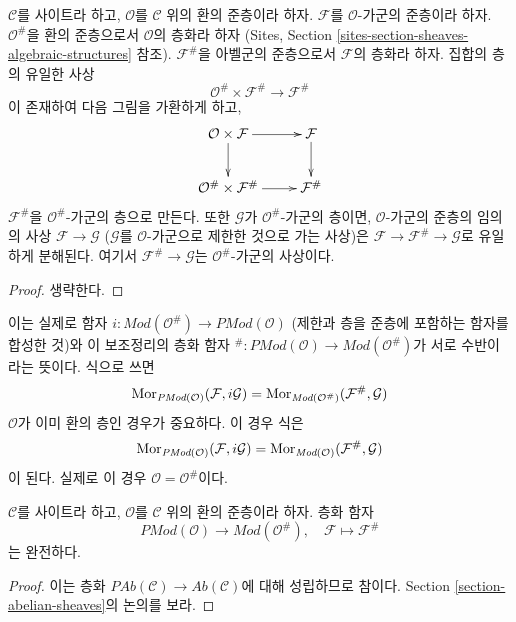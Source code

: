 \begin{lemma}
\label{lemma-sheafification-presheaf-modules}
$\mathcal{C}$를 사이트라 하고, $\mathcal{O}$를 $\mathcal{C}$ 위의 환의
준층이라 하자. $\mathcal{F}$를 $\mathcal{O}$-가군의 준층이라 하자.
$\mathcal{O}^\#$을 환의 준층으로서 $\mathcal{O}$의 층화라 하자
(Sites, Section \ref{sites-section-sheaves-algebraic-structures} 참조).
$\mathcal{F}^\#$을 아벨군의 준층으로서 $\mathcal{F}$의 층화라 하자.
집합의 층의 유일한 사상
$$
\mathcal{O}^\# \times \mathcal{F}^\#
\longrightarrow
\mathcal{F}^\#
$$
이 존재하여 다음 그림을 가환하게 하고,
$$
\xymatrix{
\mathcal{O} \times \mathcal{F} \ar[r] \ar[d] &
\mathcal{F} \ar[d] \\
\mathcal{O}^\# \times \mathcal{F}^\# \ar[r] &
\mathcal{F}^\#
}
$$
$\mathcal{F}^\#$을 $\mathcal{O}^\#$-가군의 층으로 만든다. 또한
$\mathcal{G}$가 $\mathcal{O}^\#$-가군의 층이면, $\mathcal{O}$-가군의
준층의 임의의 사상 $\mathcal{F} \to \mathcal{G}$
($\mathcal{G}$를 $\mathcal{O}$-가군으로 제한한 것으로 가는 사상)은
$\mathcal{F} \to \mathcal{F}^\# \to \mathcal{G}$로 유일하게 분해된다.
여기서 $\mathcal{F}^\# \to \mathcal{G}$는 $\mathcal{O}^\#$-가군의 사상이다.
\end{lemma}

\begin{proof}
생략한다.
\end{proof}

\noindent
이는 실제로 함자
$i : \textit{Mod}(\mathcal{O}^\#) \to \textit{PMod}(\mathcal{O})$
(제한과 층을 준층에 포함하는 함자를 합성한 것)와 이 보조정리의 층화 함자
${}^\# : \textit{PMod}(\mathcal{O}) \to \textit{Mod}(\mathcal{O}^\#)$가
서로 수반이라는 뜻이다. 식으로 쓰면
$$
\mathop{\mathrm{Mor}}\nolimits_{\textit{PMod}(\mathcal{O})}(\mathcal{F}, i\mathcal{G})
=
\mathop{\mathrm{Mor}}\nolimits_{\textit{Mod}(\mathcal{O}^\#)}(\mathcal{F}^\#, \mathcal{G})
$$
$\mathcal{O}$가 이미 환의 층인 경우가 중요하다. 이 경우 식은
$$
\mathop{\mathrm{Mor}}\nolimits_{\textit{PMod}(\mathcal{O})}(\mathcal{F}, i\mathcal{G})
=
\mathop{\mathrm{Mor}}\nolimits_{\textit{Mod}(\mathcal{O})}(\mathcal{F}^\#, \mathcal{G})
$$
이 된다. 실제로 이 경우 $\mathcal{O} = \mathcal{O}^\#$이다.

\begin{lemma}
\label{lemma-sheafification-exact}
$\mathcal{C}$를 사이트라 하고, $\mathcal{O}$를 $\mathcal{C}$ 위의 환의
준층이라 하자. 층화 함자
$$
\textit{PMod}(\mathcal{O}) \longrightarrow \textit{Mod}(\mathcal{O}^\#), \quad
\mathcal{F} \longmapsto \mathcal{F}^\#
$$
는 완전하다.
\end{lemma}

\begin{proof}
이는 층화 $\textit{PAb}(\mathcal{C}) \to \textit{Ab}(\mathcal{C})$에 대해
성립하므로 참이다. Section \ref{section-abelian-sheaves}의 논의를 보라.
\end{proof}

